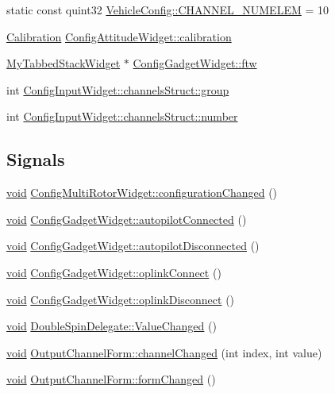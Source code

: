 \begin{DoxyCompactItemize}
static const quint32 \hyperlink{group___config_plugin_ga1d29d6e305c146323af055bb3657059f}{\-Vehicle\-Config\-::\-C\-H\-A\-N\-N\-E\-L\-\_\-\-N\-U\-M\-E\-L\-E\-M} = 10
\item 
\hyperlink{class_calibration}{\-Calibration} \hyperlink{group___config_plugin_ga4b85d588b6292a6f8755725ccca770fb}{\-Config\-Attitude\-Widget\-::calibration}
\item 
\hyperlink{class_my_tabbed_stack_widget}{\-My\-Tabbed\-Stack\-Widget} $\ast$ \hyperlink{group___config_plugin_ga86b1da74559f7e5f1e68bf0360b06dc5}{\-Config\-Gadget\-Widget\-::ftw}
\item 
int \hyperlink{group___config_plugin_gaebb67a5da44805269356236983a8c2d2}{\-Config\-Input\-Widget\-::channels\-Struct\-::group}
\item 
int \hyperlink{group___config_plugin_gaba81d9d5d38874bfa4f1c91ec8ff6ec3}{\-Config\-Input\-Widget\-::channels\-Struct\-::number}
\end{DoxyCompactItemize}
\subsection*{\-Signals}
\begin{DoxyCompactItemize}
\item 
\hyperlink{group___u_a_v_objects_plugin_ga444cf2ff3f0ecbe028adce838d373f5c}{void} \hyperlink{group___config_plugin_ga716e8f2fab4b0afb5b3c2df16b199259}{\-Config\-Multi\-Rotor\-Widget\-::configuration\-Changed} ()
\item 
\hyperlink{group___u_a_v_objects_plugin_ga444cf2ff3f0ecbe028adce838d373f5c}{void} \hyperlink{group___config_plugin_ga5c7aaec226341fec654b07be4cdcd807}{\-Config\-Gadget\-Widget\-::autopilot\-Connected} ()
\item 
\hyperlink{group___u_a_v_objects_plugin_ga444cf2ff3f0ecbe028adce838d373f5c}{void} \hyperlink{group___config_plugin_ga1ba3ecc94d2a793f945493631cc7be34}{\-Config\-Gadget\-Widget\-::autopilot\-Disconnected} ()
\item 
\hyperlink{group___u_a_v_objects_plugin_ga444cf2ff3f0ecbe028adce838d373f5c}{void} \hyperlink{group___config_plugin_ga672206f813d7364dc6bd71140773c828}{\-Config\-Gadget\-Widget\-::oplink\-Connect} ()
\item 
\hyperlink{group___u_a_v_objects_plugin_ga444cf2ff3f0ecbe028adce838d373f5c}{void} \hyperlink{group___config_plugin_gad5ee6c6370ca04c5da447e4ba0304f0b}{\-Config\-Gadget\-Widget\-::oplink\-Disconnect} ()
\item 
\hyperlink{group___u_a_v_objects_plugin_ga444cf2ff3f0ecbe028adce838d373f5c}{void} \hyperlink{group___config_plugin_ga71be1aadf5a0d023bda52f505cf7306f}{\-Double\-Spin\-Delegate\-::\-Value\-Changed} ()
\item 
\hyperlink{group___u_a_v_objects_plugin_ga444cf2ff3f0ecbe028adce838d373f5c}{void} \hyperlink{group___config_plugin_gabf138ec695ffe189e33d200b031e2687}{\-Output\-Channel\-Form\-::channel\-Changed} (int index, int value)
\item 
\hyperlink{group___u_a_v_objects_plugin_ga444cf2ff3f0ecbe028adce838d373f5c}{void} \hyperlink{group___config_plugin_gaa777808eac827fbf95642188024fc667}{\-Output\-Channel\-Form\-::form\-Changed} ()
\end{DoxyCompactItemize}
